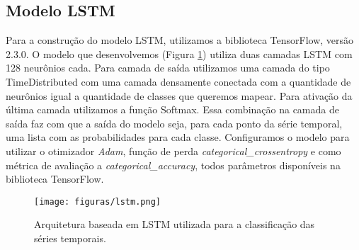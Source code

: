 \subsection{Modelo LSTM}

Para a construção do modelo LSTM, utilizamos a biblioteca TensorFlow, versão 2.3.0. O modelo que desenvolvemos (Figura \ref{fig:arquitetura_lstm}) utiliza duas camadas LSTM com 128 neurônios cada. Para camada de saída utilizamos uma camada do tipo TimeDistributed com uma camada densamente conectada com a quantidade de neurônios igual a quantidade de classes que queremos mapear. Para ativação da última camada utilizamos a função Softmax. Essa combinação na camada de saída faz com que a saída do modelo seja, para cada ponto da série temporal, uma lista com as probabilidades para cada classe.  Configuramos o modelo para utilizar o otimizador \textit{Adam}, função de perda \textit{categorical\_crossentropy} e como métrica de avaliação a \textit{categorical\_accuracy}, todos parâmetros disponíveis na biblioteca TensorFlow. 

\begin{figure}[H]
\centering
\caption{Arquitetura baseada em LSTM utilizada para a classificação das séries temporais.}
\label{fig:arquitetura_lstm}
\texttt{[image: figuras/lstm.png]}
\end{figure}

\renewcommand{\cleardoublepage}{}
\renewcommand{\clearpage}{}
\vspace{5mm}